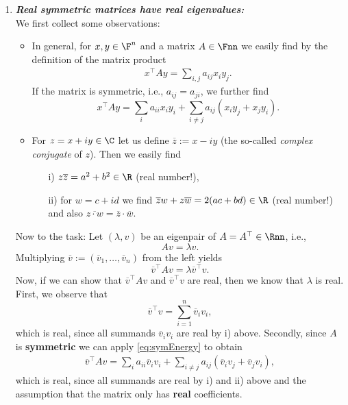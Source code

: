 {\begin{enumerate}
	\item \textbf{\textit{Real symmetric matrices have real eigenvalues:}}\\ 
	We first collect some observations:
	\begin{itemize}
		\item In general, for $x,y\in \F^n$ and a matrix $A \in \Fnn$ we easily find by the definition of the matrix product
		\begin{align*}
		x^\top A y = \sum_{i,j}a_{ij}x_i y_j .
		\end{align*}
		If the matrix is symmetric, i.e., $a_{ij}= a_{ji}$, we further find
		\begin{equation} \label{eq:symEnergy}
	     	x^\top A y = \sum_{i}a_{ii}x_iy_i  +  \sum_{i \neq j}a_{ij} (x_i y_j  + x_jy_i).
		\end{equation}
		\item For $z=x+iy \in \C$ let us define $\overline{z} := x-iy$ (the so-called \textit{complex conjugate} of $z$). Then we easily find
		\begin{itemize}
			\item[i)] $z \overline{z} = a^2 + b^2 \in \R$ (real number!),
			\item[ii)] for $w = c +id$ we find $\overline{z}w + z \overline{w} = 2(ac+bd) \in \R$ (real number!) and also $\overline{z\cdot w} = \overline{z}\cdot\overline{w}$.
		\end{itemize}
	\end{itemize}
	Now to the task: Let $(\lambda, v)$ be an eigenpair of $A=A^\top \in \Rnn$, i.e., 
	$$Av = \lambda v. $$
	Multiplying $\overline{v} := (\overline{v}_1,\ldots, \overline{v}_n)$ from the left yields
		$$\overline{v}^\top Av = \lambda \overline{v}^\top v. $$
	Now, if we can show that $\overline{v}^\top Av$ and $\overline{v}^\top v$ are real, then we know that $\lambda$ is real. First, we observe that 
	$$\overline{v}^\top v = \sum_{i=1}^n  \overline{v}_i v_i,$$
	which is real, since all summands $ \overline{v}_i v_i$ are real by i) above. Secondly, since $A$ is \textbf{symmetric} we can apply \eqref{eq:symEnergy} to obtain
	\begin{align*}
	 \overline{v}^\top Av = \sum_{i} a_{ii}\overline{v}_i v_i +  \sum_{i \neq j}a_{ij} (\overline{v}_i v_j  + \overline{v}_jv_i),
	\end{align*}
	which is real, since all summands are real by i) and ii) above and the assumption that the matrix only has \textbf{real} coefficients.
~\\~\\

\end{enumerate}}
